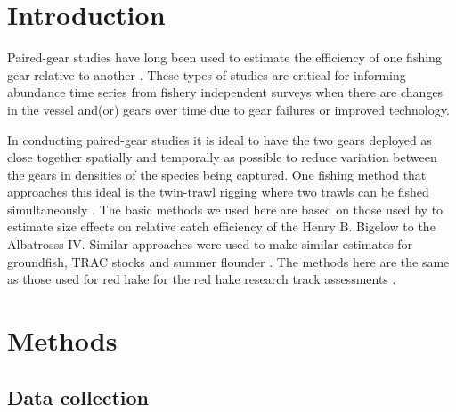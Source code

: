 \documentclass[12pt,letterpaper, leqno]{article}
\begin{document}
\pagebreak

\section*{Introduction}

Paired-gear studies have long been used to estimate the efficiency of one fishing gear relative to another \citep[e.g.,][]{gulland64,bourne65}.  These types of studies are critical for informing abundance time series from fishery independent surveys when there are changes in the vessel and(or) gears over time due to gear failures or improved technology. 

In conducting paired-gear studies it is ideal to have the two gears deployed as close together spatially and temporally as possible to reduce variation between the gears in densities of the species being captured. One fishing method that approaches this ideal is the twin-trawl rigging where two trawls can be fished simultaneously \citep{ices96}. The basic methods we used here are based on those used by \citet{miller13} to estimate size effects on relative catch efficiency of the Henry B. Bigelow to the Albatrosss IV. Similar approaches were used to make similar estimates for groundfish, TRAC stocks and summer flounder \citep{milleretal17a,milleretal17b}.  The methods here are the same as those used for red hake for the red hake research track assessments \citep{milleretal20}.

\section*{Methods}

\subsection*{Data collection}
\end{document}
